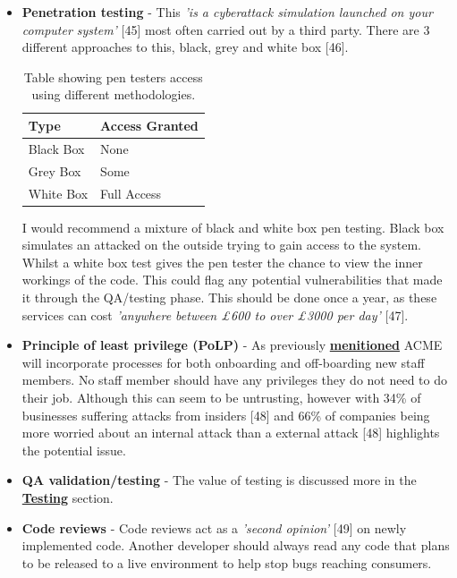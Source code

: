   \begin{itemize}
    \item \textbf{Penetration testing} - This \textit{'is a cyberattack simulation launched on your computer system'} [45] most often carried out by a
    third party. There are 3 different approaches to this, black, grey and white box [46].

    \begin{table}[H]
      \centering
      \begin{tabular}{|l|l|}
        \hline
        \textbf{Type} & \textbf{Access Granted}   \\ \hline
        Black Box     & None                      \\ \hline
        Grey Box      & Some                      \\ \hline
        White Box     & Full Access               \\ \hline
      \end{tabular}
      \caption{Table showing pen testers access using different methodologies.}
    \end{table}

    I would recommend a mixture of black and white box pen testing. Black box simulates an attacked on the outside trying to gain access to the system.
    Whilst a white box test gives the pen tester the chance to view the inner workings of the code. This could flag any potential vulnerabilities that 
    made it through the QA/testing phase. This should be done once a year, as these services can cost 
    \textit{'anywhere between £600 to over £3000 per day'} [47].

    \item \textbf{Principle of least privilege (PoLP)} - As previously \hyperref[sec:PoLP]{\textbf{menitioned}} ACME will incorporate processes for 
    both onboarding and off-boarding new staff members. No staff member should have any privileges they do not need to do their job. Although this can seem 
    to be untrusting, however with 34\% of businesses suffering attacks from insiders [48] and 66\% of companies being more worried about an internal attack 
    than a external attack [48] highlights the potential issue.

    \item \textbf{QA validation/testing} - The value of testing is discussed more in the \hyperref[sec:Testing]{\textbf{Testing}} section.
    
    \item \textbf{Code reviews} - Code reviews act as a \textit{'second opinion'} [49] on newly implemented code. Another developer should always read any 
    code that plans to be released to a live environment to help stop bugs reaching consumers.


\end{itemize}
